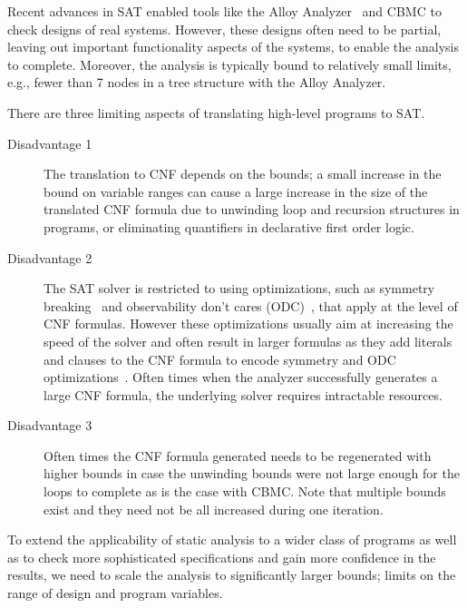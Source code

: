 

Recent advances in SAT enabled tools like the 
Alloy Analyzer~\cite{jackson2002alloy} and CBMC to check designs of real systems.
However,
these designs often need to be partial, leaving out 
important functionality aspects of the systems, 
to enable the analysis to complete.  
Moreover, the analysis is typically bound to
relatively small limits, e.g., fewer than 7 nodes in 
a tree structure with the Alloy Analyzer.

There are three limiting aspects of translating high-level 
programs to SAT.  
\begin{description}

\item[Disadvantage 1]
The translation to CNF depends on
the bounds; a small increase in the bound on variable
ranges can cause a large increase in the size of the
translated CNF formula due to unwinding loop and recursion
structures in programs, or eliminating quantifiers 
in declarative first order logic.

\item[Disadvantage 2] 
The SAT solver is restricted to
using optimizations, such as symmetry
breaking~\cite{Aloul02SymSAT} and observability don't
cares (ODC)~\cite{FuYuMalik2005}, that apply at the level
of CNF formulas.  
However these optimizations usually aim
at increasing the speed of the solver and often result in
larger formulas as they add literals and clauses to the
CNF formula to encode symmetry and ODC
optimizations~\cite{ZhuKu06SATSweepODC}.  
Often times when
the analyzer successfully generates a large CNF formula,
the underlying solver requires intractable resources.

\item[Disadvantage 3] 
Often times the CNF formula
generated needs to be regenerated with higher bounds in
case the unwinding bounds were not large enough for the
loops to complete as is the case with CBMC. 
Note that multiple bounds exist and they need not be all
increased during one iteration.
\end{description}

To extend the applicability of static analysis to a wider
class of programs as well as to check more
sophisticated specifications 
and gain more confidence in the
results, we need to scale the analysis to significantly
larger bounds; limits on the range of design and program
variables.